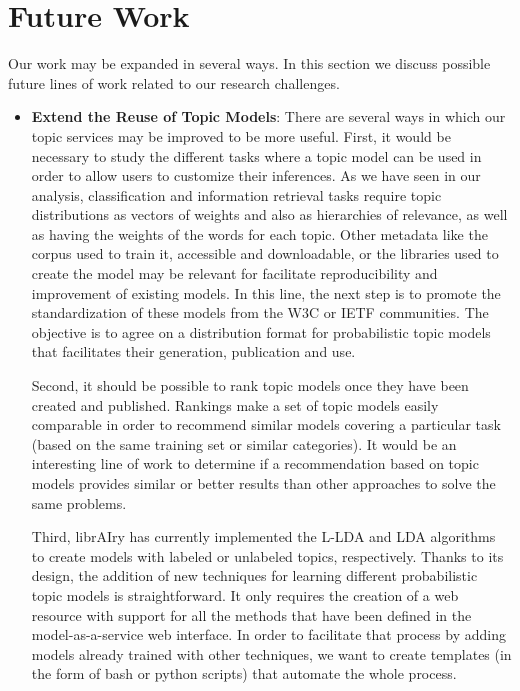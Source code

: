 
\section{Future Work}

Our work may be expanded in several ways. In this section we discuss possible future lines of work related to our research challenges.

\begin{itemize}
\item \textbf{Extend the Reuse of Topic Models}: There are several ways in which our topic services may be improved to be more useful. First, it would be necessary to study the different tasks where a topic model can be used in order to allow users to customize their inferences. As we have seen in our analysis, classification and information retrieval tasks require topic distributions as vectors of weights and also as hierarchies of relevance, as well as having the weights of the words for each topic. Other metadata like the corpus used to train it, accessible and downloadable, or the libraries used to create the model may be relevant for facilitate reproducibility and improvement of existing models. In this line, the next step is to promote the standardization of these models from the W3C or IETF communities. The objective is to agree on a distribution format for probabilistic topic models that facilitates their generation, publication and use.

Second, it should be possible to rank topic models once they have been created and published. Rankings make a set of topic models easily comparable in order to recommend similar models covering a particular task (based on the same training set or similar categories). It would be an interesting line of work to determine if a recommendation based on topic models provides similar or better results than other approaches to solve the same problems.

Third, librAIry has currently implemented the L-LDA and LDA algorithms to create models with labeled or unlabeled topics, respectively. Thanks to its design, the addition of new techniques for learning different probabilistic topic models is straightforward. It only requires the creation of a web resource with support for all the methods that have been defined in the model-as-a-service web interface. In order to facilitate that process by adding models already trained with other techniques, we want to create templates (in the form of bash or python scripts) that automate the whole process.


\end{itemize}
